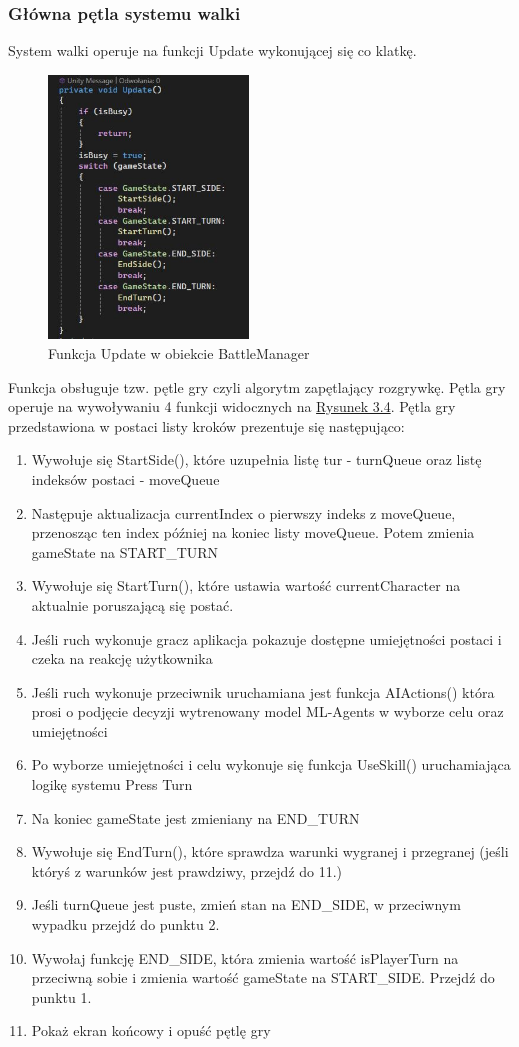 \documentclass{SGGW-thesis}
\begin{document}
\subsubsection{Główna pętla systemu walki}
\label{petlagry}
System walki operuje na funkcji Update wykonującej się co klatkę.
\begin{figure}[H]
  \centering
  \includegraphics[height=7cm]{updatebattle.JPG}
  \caption{Funkcja Update w obiekcie BattleManager}
  \label{fig:UpdateBattle}
\end{figure}

Funkcja obsługuje tzw. pętle gry czyli algorytm zapętlający rozgrywkę. Pętla gry operuje na wywoływaniu 4 funkcji widocznych na \hyperref[fig:UpdateBattle]{Rysunek 3.4}. Pętla gry przedstawiona w postaci listy kroków prezentuje się następująco:
\begin{enumerate}
  \item{Wywołuje się StartSide(), które uzupełnia listę tur - turnQueue oraz listę indeksów postaci - moveQueue}
  \item{Następuje aktualizacja currentIndex o pierwszy indeks z moveQueue, przenosząc ten index później na koniec listy moveQueue. Potem zmienia gameState na START\_TURN}
  \item{Wywołuje się StartTurn(), które ustawia wartość currentCharacter na aktualnie poruszającą się postać.}
  \item{Jeśli ruch wykonuje gracz aplikacja pokazuje dostępne umiejętności postaci i czeka na reakcję użytkownika}
  \item{Jeśli ruch wykonuje przeciwnik uruchamiana jest funkcja AIActions() która prosi o podjęcie decyzji wytrenowany model ML-Agents w wyborze celu oraz umiejętności}
  \item{Po wyborze umiejętności i celu wykonuje się funkcja UseSkill() uruchamiająca logikę systemu Press Turn}
  \item{Na koniec gameState jest zmieniany na END\_TURN}
  \item{Wywołuje się EndTurn(), które sprawdza warunki wygranej i przegranej (jeśli któryś z warunków jest prawdziwy, przejdź do 11.)}
  \item{Jeśli turnQueue jest puste, zmień stan na END\_SIDE, w przeciwnym wypadku przejdź do punktu 2.}
  \item{Wywołaj funkcję END\_SIDE, która zmienia wartość isPlayerTurn na przeciwną sobie i zmienia wartość gameState na START\_SIDE. Przejdź do punktu 1.}
  \item{Pokaż ekran końcowy i opuść pętlę gry}
\end{enumerate}
\end{document}
